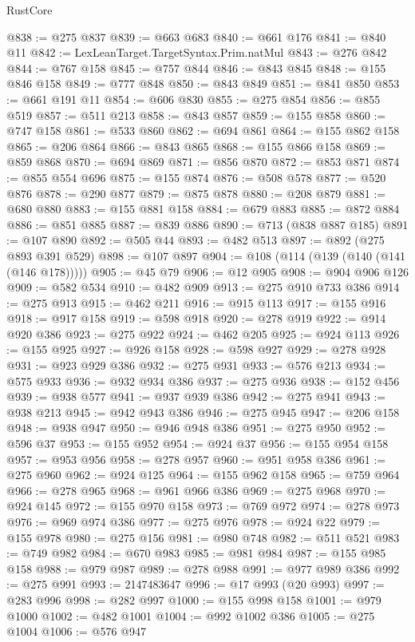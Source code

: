 \begin{lexlean}{RustCore}
\begin{coremodule}
@838 := @275 @837
@839 := @663 @683
@840 := @661 @176
@841 := @840 @11
@842 := LexLeanTarget.TargetSyntax.Prim.natMul
@843 := @276 @842
@844 := @767 @158
@845 := @757 @844
@846 := @843 @845
@848 := @155 @846 @158
@849 := @777 @848
@850 := @843 @849
@851 := @841 @850
@853 := @661 @191 @11
@854 := @606 @830
@855 := @275 @854
@856 := @855 @519
@857 := @511 @213
@858 := @843 @857
@859 := @155 @858
@860 := @747 @158
@861 := @533 @860
@862 := @694 @861
@864 := @155 @862 @158
@865 := @206 @864
@866 := @843 @865
@868 := @155 @866 @158
@869 := @859 @868
@870 := @694 @869
@871 := @856 @870
@872 := @853 @871
@874 := @855 @554 @696
@875 := @155 @874
@876 := @508 @578
@877 := @520 @876
@878 := @290 @877
@879 := @875 @878
@880 := @208 @879
@881 := @680 @880
@883 := @155 @881 @158
@884 := @679 @883
@885 := @872 @884
@886 := @851 @885
@887 := @839 @886
@890 := @713 (@838 @887 @185)
@891 := @107 @890
@892 := @505 @44
@893 := @482 @513
@897 := @892 (@275 @893 @391 @529)
@898 := @107 @897
@904 := @108 (@114 (@139 (@140 (@141 (@146 @178)))))
@905 := @45 @79
@906 := @12 @905
@908 := @904 @906 @126
@909 := @582 @534
@910 := @482 @909
@913 := @275 @910 @733 @386
@914 := @275 @913
@915 := @462 @211
@916 := @915 @113
@917 := @155 @916
@918 := @917 @158
@919 := @598 @918
@920 := @278 @919
@922 := @914 @920 @386
@923 := @275 @922
@924 := @462 @205
@925 := @924 @113
@926 := @155 @925
@927 := @926 @158
@928 := @598 @927
@929 := @278 @928
@931 := @923 @929 @386
@932 := @275 @931
@933 := @576 @213
@934 := @575 @933
@936 := @932 @934 @386
@937 := @275 @936
@938 := @152 @456
@939 := @938 @577
@941 := @937 @939 @386
@942 := @275 @941
@943 := @938 @213
@945 := @942 @943 @386
@946 := @275 @945
@947 := @206 @158
@948 := @938 @947
@950 := @946 @948 @386
@951 := @275 @950
@952 := @596 @37
@953 := @155 @952
@954 := @924 @37
@956 := @155 @954 @158
@957 := @953 @956
@958 := @278 @957
@960 := @951 @958 @386
@961 := @275 @960
@962 := @924 @125
@964 := @155 @962 @158
@965 := @759 @964
@966 := @278 @965
@968 := @961 @966 @386
@969 := @275 @968
@970 := @924 @145
@972 := @155 @970 @158
@973 := @769 @972
@974 := @278 @973
@976 := @969 @974 @386
@977 := @275 @976
@978 := @924 @22
@979 := @155 @978
@980 := @275 @156
@981 := @980 @748
@982 := @511 @521
@983 := @749 @982
@984 := @670 @983
@985 := @981 @984
@987 := @155 @985 @158
@988 := @979 @987
@989 := @278 @988
@991 := @977 @989 @386
@992 := @275 @991
@993 := 2147483647
@996 := @17 @993 (@20 @993)
@997 := @283 @996
@998 := @282 @997
@1000 := @155 @998 @158
@1001 := @979 @1000
@1002 := @482 @1001
@1004 := @992 @1002 @386
@1005 := @275 @1004
@1006 := @576 @947

\end{coremodule}
\end{lexlean}
